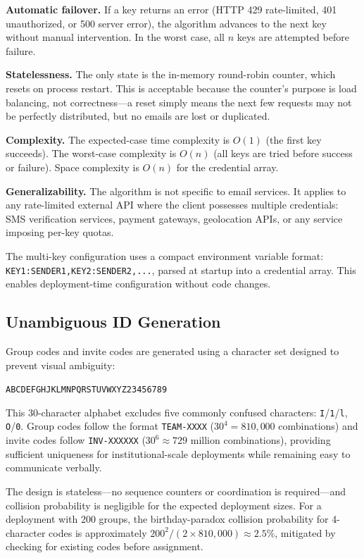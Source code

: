 \documentclass[11pt,a4paper]{article}
\theoremstyle{plain}
\theoremstyle{definition}
\begin{document}
\textbf{Automatic failover.} If a key returns an error (HTTP 429 rate-limited, 401 unauthorized, or 500 server error), the algorithm advances to the next key without manual intervention. In the worst case, all $n$ keys are attempted before failure.

\textbf{Statelessness.} The only state is the in-memory round-robin counter, which resets on process restart. This is acceptable because the counter's purpose is load balancing, not correctness---a reset simply means the next few requests may not be perfectly distributed, but no emails are lost or duplicated.

\textbf{Complexity.} The expected-case time complexity is $O(1)$ (the first key succeeds). The worst-case complexity is $O(n)$ (all keys are tried before success or failure). Space complexity is $O(n)$ for the credential array.

\textbf{Generalizability.} The algorithm is not specific to email services. It applies to any rate-limited external API where the client possesses multiple credentials: SMS verification services, payment gateways, geolocation APIs, or any service imposing per-key quotas.

The multi-key configuration uses a compact environment variable format: \texttt{KEY1:SENDER1,KEY2:SENDER2,...}, parsed at startup into a credential array. This enables deployment-time configuration without code changes.

\subsection{Unambiguous ID Generation}

Group codes and invite codes are generated using a character set designed to prevent visual ambiguity:

\begin{center}
\texttt{ABCDEFGHJKLMNPQRSTUVWXYZ23456789}
\end{center}

This 30-character alphabet excludes five commonly confused characters: \texttt{I}/\texttt{1}/\texttt{l}, \texttt{O}/\texttt{0}. Group codes follow the format \texttt{TEAM-XXXX} ($30^4 = 810{,}000$ combinations) and invite codes follow \texttt{INV-XXXXXX} ($30^6 \approx 729$ million combinations), providing sufficient uniqueness for institutional-scale deployments while remaining easy to communicate verbally.

The design is stateless---no sequence counters or coordination is required---and collision probability is negligible for the expected deployment sizes. For a deployment with 200 groups, the birthday-paradox collision probability for 4-character codes is approximately $200^2 / (2 \times 810{,}000) \approx 2.5\%$, mitigated by checking for existing codes before assignment.
\end{document}
